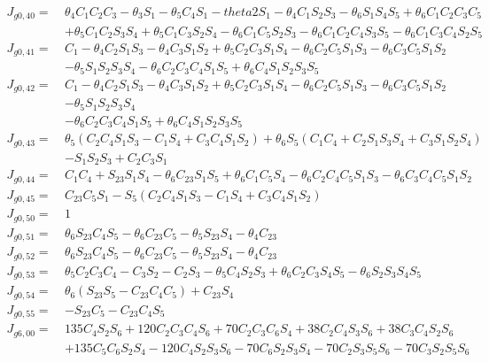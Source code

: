 \documentclass[12pt]{article}
\begin{document}
\begin{CJK}{UTF8}{bsmi}
\begin{equation*}
\begin{split}
J_{g0,40} =\  &\theta _4C_1C_2C_3 - \theta _3S_1 - \theta _5C_4S_1 - theta2S_1 - \theta _4C_1S_2S_3 - \theta _6S_1S_4S_5 + \theta _6C_1C_2C_3C_5\\
		 	  &+ \theta _5C_1C_2S_3S_4 + \theta _5C_1C_3S_2S_4 - \theta _6C_1C_5S_2S_3 - \theta _6C_1C_2C_4S_3S_5 - \theta _6C_1C_3C_4S_2S_5\\
J_{g0,41} =\  &C_1 - \theta _4C_2S_1S_3 - \theta _4C_3S_1S_2 + \theta _5C_2C_3S_1S_4 - \theta _6C_2C_5S_1S_3 - \theta _6C_3C_5S_1S_2 \\
		 	  &- \theta _5S_1S_2S_3S_4 - \theta _6C_2C_3C_4S_1S_5 + \theta _6C_4S_1S_2S_3S_5\\
J_{g0,42} =\  &C_1 - \theta _4C_2S_1S_3 - \theta _4C_3S_1S_2 + \theta _5C_2C_3S_1S_4 - \theta _6C_2C_5S_1S_3 - \theta _6C_3C_5S_1S_2\\
			  & - \theta _5S_1S_2S_3S_4\\
		 	  &- \theta _6C_2C_3C_4S_1S_5 + \theta _6C_4S_1S_2S_3S_5\\
J_{g0,43} =\  &\theta _5(C_2C_4S_1S_3 - C_1S_4 + C_3C_4S_1S_2) + \theta _6S_5(C_1C_4 + C_2S_1S_3S_4 + C_3S_1S_2S_4)\\
		 	  &- S_1S_2S_3 + C_2C_3S_1\\
J_{g0,44} =\  &C_1C_4 + S_{23}S_1S_4 - \theta _6C_{23}S_1S_5 + \theta _6C_1C_5S_4 - \theta _6C_2C_4C_5S_1S_3 - \theta _6C_3C_4C_5S_1S_2\\
J_{g0,45} =\  &C_{23}C_5S_1 - S_5(C_2C_4S_1S_3 - C_1S_4 + C_3C_4S_1S_2)\\
J_{g0,50} =\  &1\\
J_{g0,51} =\  &\theta _6S_{23}C_4S_5 - \theta _6C_{23}C_5 - \theta _5S_{23}S_4 - \theta _4C_{23}\\
J_{g0,52} =\  &\theta _6S_{23}C_4S_5 - \theta _6C_{23}C_5 - \theta _5S_{23}S_4 - \theta _4C_{23}\\
J_{g0,53} =\  &\theta _5C_2C_3C_4 - C_3S_2 - C_2S_3 - \theta _5C_4S_2S_3 + \theta _6C_2C_3S_4S_5 - \theta _6S_2S_3S_4S_5\\
J_{g0,54} =\  &\theta _6(S_{23}S_5 - C_{23}C_4C_5) + C_{23}S_4\\
J_{g0,55} =\  &- S_{23}C_5 - C_{23}C_4S_5\\
J_{g6,00} =\  &135C_4S_2S_6 + 120C_2C_3C_4S_6 + 70C_2C_3C_6S_4 + 38C_2C_4S_3S_6 + 38C_3C_4S_2S_6\\
			  &+ 135C_5C_6S_2S_4 - 120C_4S_2S_3S_6 - 70C_6S_2S_3S_4 - 70C_2S_3S_5S_6 - 70C_3S_2S_5S_6\\

\end{split}
\end{equation*}
\end{CJK}
\end{document}
